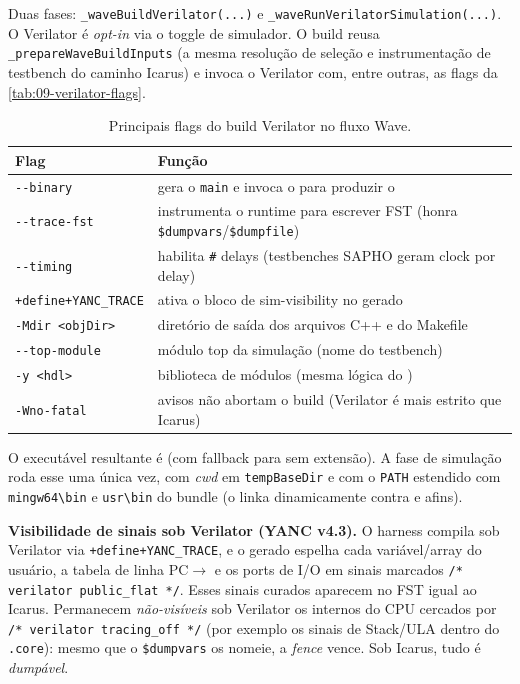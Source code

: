 Duas fases: \lstinline|_waveBuildVerilator(...)| e
\lstinline|_waveRunVerilatorSimulation(...)|. O Verilator é \emph{opt-in} via o
toggle de simulador. O build reusa \lstinline|_prepareWaveBuildInputs| (a mesma
resolução de seleção e instrumentação de testbench do caminho Icarus) e invoca
o Verilator com, entre outras, as flags da \autoref{tab:09-verilator-flags}.

\begin{table}[h]
\centering
\begin{tabularx}{\linewidth}{Y Z}
\toprule
\textbf{Flag} & \textbf{Função} \\
\midrule
\lstinline|--binary| & gera o \lstinline|main| e invoca o  para produzir o  \\
\lstinline|--trace-fst| & instrumenta o runtime para escrever FST (honra \lstinline|$dumpvars|/\lstinline|$dumpfile|) \\
\lstinline|--timing| & habilita \lstinline|#| delays (testbenches SAPHO geram clock por delay) \\
\lstinline|+define+YANC_TRACE| & ativa o bloco de sim-visibility no  gerado \\
\lstinline|-Mdir <objDir>| & diretório de saída dos arquivos C++ e do Makefile \\
\lstinline|--top-module| & módulo top da simulação (nome do testbench) \\
\lstinline|-y <hdl>| & biblioteca de módulos (mesma lógica do ) \\
\lstinline|-Wno-fatal| & avisos não abortam o build (Verilator é mais estrito que Icarus) \\
\bottomrule
\end{tabularx}
\caption{Principais flags do build Verilator no fluxo Wave.}
\label{tab:09-verilator-flags}
\end{table}

O executável resultante é  (com fallback para
 sem extensão). A fase de simulação roda esse  uma
única vez, com \emph{cwd} em \lstinline|tempBaseDir| e com o \lstinline|PATH|
estendido com \lstinline|mingw64\bin| e \lstinline|usr\bin| do bundle (o
 linka dinamicamente contra  e afins).

\begin{nota}
\textbf{Visibilidade de sinais sob Verilator (YANC v4.3).} O harness compila
sob Verilator via \lstinline|+define+YANC_TRACE|, e o  gerado
espelha cada variável/array do usuário, a tabela de linha PC$\rightarrow$\cmm{}
e os ports de I/O em sinais marcados \lstinline|/* verilator public_flat */|.
Esses sinais curados aparecem no FST igual ao Icarus. Permanecem
\emph{não-visíveis} sob Verilator os internos do CPU cercados por
\lstinline|/* verilator tracing_off */| (por exemplo os sinais de Stack/ULA
dentro do \lstinline|.core|): mesmo que o \lstinline|$dumpvars| os nomeie, a
\emph{fence} vence. Sob Icarus, tudo é \emph{dumpável}.
\end{nota}

